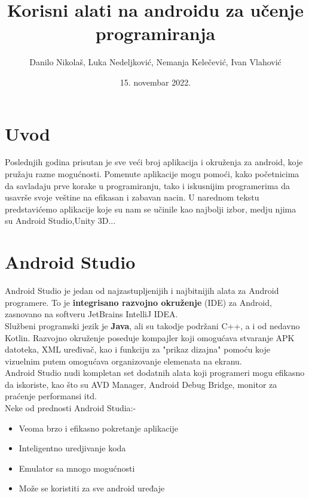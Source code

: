 \documentclass[12pt]{article}
\title{Korisni alati na androidu za učenje programiranja}
\author{Danilo Nikolaš, Luka Nedeljković, Nemanja Kelečević, Ivan Vlahović}
\date{15. novembar 2022.}
\begin{document}
\maketitle
\tableofcontents
\pagebreak

\section{Uvod}
Poslednjih godina prisutan je sve veći broj aplikacija i okruženja za android, koje pružaju razne mogućnosti.
Pomenute aplikacije mogu pomoći, kako početnicima da savladaju prve korake u programiranju, tako i iskusnijim programerima da usavrše svoje veštine na efikasan i zabavan nacin.
U narednom tekstu predstavićemo aplikacije koje su nam se učinile kao najbolji izbor, medju njima su Android Studio,Unity 3D... \

\section{Android Studio}
Android Studio je jedan od najzastupljenijih i najbitnijih alata za Android programere. To je \textbf{integrisano razvojno okruženje} (IDE) za Android, zasnovano na softveru JetBrains IntelliJ IDEA.  \\
\hspace*{1cm}Službeni programski jezik je \textbf{Java}, ali su takodje podržani C++, a i od nedavno Kotlin. Razvojno okruženje poseduje kompajler koji omogućava stvaranje APK datoteka, XML uređivač, kao i funkciju za "prikaz dizajna" pomoću koje vizuelnim putem omogućava organizovanje elemenata na ekranu. \\
\hspace*{1cm}Android Studio nudi kompletan set dodatnih alata koji programeri mogu efikasno da iskoriste, kao što su AVD Manager, Android Debug Bridge, monitor za praćenje performansi itd.\\
Neke od prednosti Android Studia:-
\begin{itemize}
\item{Veoma brzo i efikasno pokretanje aplikacije}
\item{Inteligentno uredjivanje koda} 
\item{Emulator sa mnogo mogućnosti}
\item{Može se koristiti za sve android uređaje}
\end{itemize}
\end{document}

